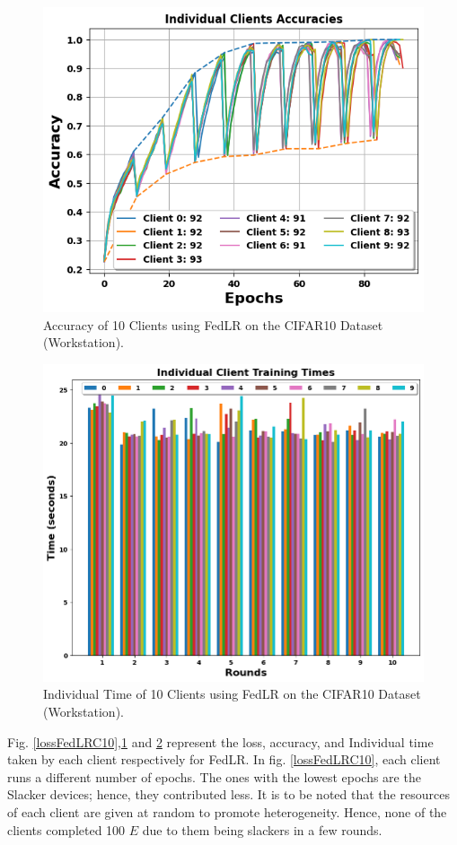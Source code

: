 \documentclass[conference]{IEEEtran}
\begin{document}
\begin{figure}[htp!]
	\centering
	\includegraphics[scale=.51]{Images/NEWGRAPHS/acc_fedlr.png}
	\caption{Accuracy of 10 Clients using FedLR on the CIFAR10 Dataset (Workstation).}
	\label{accFedLRC10}
\end{figure}

\begin{figure}[htp!]
	\centering
	\includegraphics[scale=.4]{Images/NEWGRAPHS/time_fedlr_612o83.png}
	\caption{Individual Time of 10 Clients using FedLR on the CIFAR10 Dataset (Workstation).}
	\label{FedLRTimeC10}


\end{figure}
Fig. \ref{lossFedLRC10},\ref{accFedLRC10} and \ref{FedLRTimeC10} represent the loss, accuracy,
and Individual time taken by each client respectively for FedLR. In fig. \ref{lossFedLRC10}, each client runs a different number of epochs. The ones with the lowest epochs are the Slacker devices; hence, they contributed less. It is to be noted that the resources of each client are given at random to promote heterogeneity. Hence, none of the clients completed 100 $E$ due to them being slackers in a few rounds.
\end{document}
